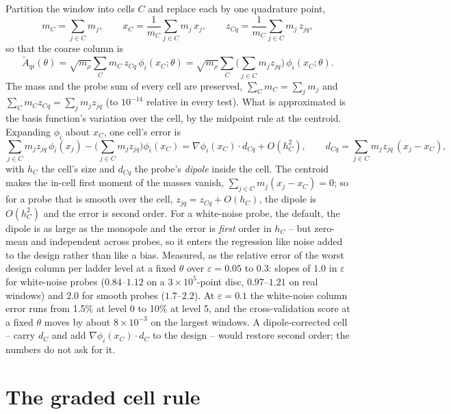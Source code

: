 \documentclass[11pt]{article}
\newcommand{\eps}{\varepsilon}
\begin{document}
Partition the window into cells $C$ and replace each by one quadrature point,
\begin{equation}
m_C = \sum_{j\in C} m_j, \qquad
x_C = \frac{1}{m_C}\sum_{j\in C} m_j\, x_j, \qquad
z_{Cq} = \frac{1}{m_C}\sum_{j\in C} m_j\, z_{jq},
\label{eq:aggregate}
\end{equation}
so that the coarse column is
\begin{equation}
\tilde A_{qi}(\theta) = \sqrt{m_\rho}\sum_C m_C\, z_{Cq}\, \phi_i(x_C;\theta)
 = \sqrt{m_\rho}\sum_C \Big(\sum_{j\in C} m_j z_{jq}\Big)\, \phi_i(x_C;\theta).
\label{eq:coarse-design}
\end{equation}
The mass and the probe sum of every cell are preserved, $\sum_C m_C = \sum_j
m_j$ and $\sum_C m_C z_{Cq} = \sum_j m_j z_{jq}$ (to $10^{-14}$ relative in
every test). What is approximated is the basis function's variation over the
cell, by the midpoint rule at the centroid. Expanding $\phi_i$ about $x_C$,
one cell's error is
\begin{equation}
\sum_{j\in C} m_j z_{jq}\,\phi_i(x_j) - \Big(\sum_{j\in C} m_j z_{jq}\Big)\phi_i(x_C)
 = \nabla\phi_i(x_C)\cdot d_{Cq} + O(h_C^2), \qquad
d_{Cq} = \sum_{j\in C} m_j z_{jq}\,(x_j - x_C),
\label{eq:dipole}
\end{equation}
with $h_C$ the cell's size and $d_{Cq}$ the probe's \emph{dipole} inside the
cell. The centroid makes the in-cell first moment of the masses vanish,
$\sum_{j\in C} m_j (x_j - x_C) = 0$; so for a probe that is smooth over the
cell, $z_{jq} = z_{Cq} + O(h_C)$, the dipole is $O(h_C^2)$ and the error is
second order. For a white-noise probe, the
default, the dipole is as large as the monopole and the error is \emph{first}
order in $h_C$ -- but zero-mean and independent across probes, so it enters
the regression like noise added to the design rather than like a bias.
Measured, as the relative error of the worst design column per ladder level
at a fixed $\theta$ over $\eps = 0.05$ to $0.3$: slopes of $1.0$ in $\eps$
for white-noise probes ($0.84$--$1.12$ on a $3\times 10^5$-point disc,
$0.97$--$1.21$ on real windows) and $2.0$ for smooth probes ($1.7$--$2.2$).
At $\eps = 0.1$ the white-noise column error runs from 1.5\% at level 0 to
10\% at level 5, and the cross-validation score at a fixed $\theta$ moves by
about $8\times 10^{-3}$ on the largest windows. A dipole-corrected cell --
carry $d_C$ and add $\nabla\phi_i(x_C)\cdot d_C$ to the design -- would
restore second order; the numbers do not ask for it.

\section{The graded cell rule}
\label{sec:grading}
\end{document}
